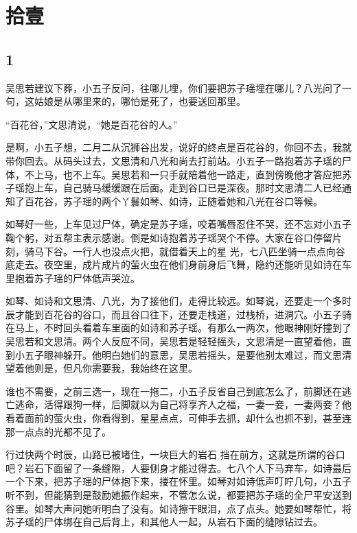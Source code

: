 \section{拾壹}

{\centering\subsection{1}}

吴思若建议下葬，小五子反问，往哪儿埋，你们要把苏子瑶埋在哪儿？八光问了一句，这姑娘是从哪里来的，哪怕是死了，也要送回那里。

“百花谷，”文思清说，“她是百花谷的人。”

是啊，小五子想，二月二从沉狮谷出发，说好的终点是百花谷的，你回不去，我就带你回去。从码头过去，文思清和八光和尚去打前站。小五子一路抱着苏子瑶的尸体，不上马，也不上车。吴思若和一只手就陪着他一路走，直到傍晚他才答应把苏子瑶抱上车，自己骑马缓缓跟在后面。走到谷口已是深夜。那时文思清二人已经通知了百花谷，苏子瑶的两个丫鬟如琴、如诗，正随着她和八光在谷口等候。

如琴好一些，上车见过尸体，确定是苏子瑶，咬着嘴唇忍住不哭，还不忘对小五子鞠个躬，对五帮主表示感谢。倒是如诗抱着苏子瑶哭个不停。大家在谷口停留片刻，骑马下谷。一行人也没点火把，就借着天上的星
光，七八匹坐骑一点点向谷底走去。夜空里，成片成片的萤火虫在他们身前身后飞舞，隐约还能听见如诗在车里抱着苏子瑶的尸体低声哭泣。

如琴、如诗和文思清、八光，为了接他们，走得比较远。如琴说，还要走一个多时辰才能到百花谷的谷口，而且谷口往下，还要走栈道，过栈桥，进洞穴。小五子骑在马上，不时回头看着车里面的如诗和苏子瑶。有那么一两次，他眼神刚好撞到了吴思若和文思清。两个人反应不同，吴思若是轻轻摇头，文思清是一直望着他，直到小五子眼神躲开。他明白她们的意思，吴思若摇头，是要他别太难过，而文思清望着他则是，但凡你需要我，我始终在这里。

谁也不需要，之前三选一，现在一拖二，小五子反省自己到底怎么了，前脚还在逃亡逃命，活得跟狗一样，后脚就以为自己将享齐人之福，一妻一妾，一妻两妾？他看着面前的萤火虫，你看得到，星星点点，可伸手去抓，却什么也抓不到，甚至连那一点点的光都不见了。

行过快两个时辰，山路已被堵住，一块巨大的岩石
挡在前方，这就是所谓的谷口吧？岩石下面留了一条缝隙，人要侧身才能过得去。七八个人下马弃车，如诗最后一个下来，把苏子瑶的尸体抱下来，搂在怀里。如琴对如诗低声叮咛几句，小五子听不到，但能猜到是鼓励她振作起来，不管怎么说，都要把苏子瑶的全尸平安送到谷里。如琴大声问她听明白了没有。如诗擦干眼泪，点了点头。她要如琴帮忙，将苏子瑶的尸体绑在自己后背上，和其他人一起，从岩石下面的缝隙钻过去。

